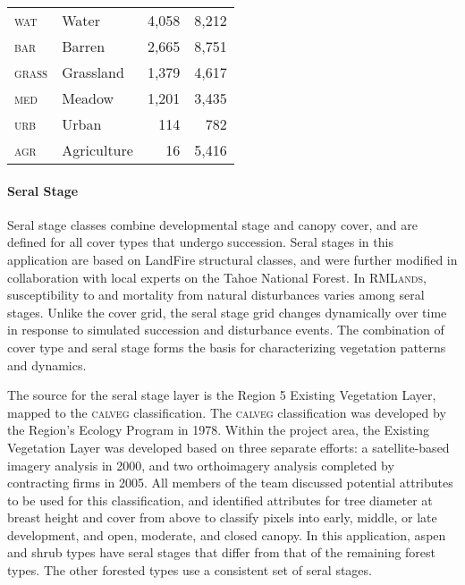 \begin{table}[!htbp]
\begin{tabular}{@{}llrr@{}}
                        \textsc{wat     }     & Water                                        & 4,058          & 8,212          \\
\rowcolor[HTML]{CAD6BA} \textsc{bar     }     & Barren                                       & 2,665        & 8,751     \\
                        \textsc{grass   }     & Grassland                                    & 1,379        & 4,617     \\
\rowcolor[HTML]{CAD6BA} \textsc{med     }     & Meadow                                       & 1,201        & 3,435     \\
                        \textsc{urb     }     & Urban                                        & 114                  & 782            \\
\rowcolor[HTML]{CAD6BA} \textsc{agr     }     & Agriculture                                  & 16          & 5,416     \\ \bottomrule

\end{tabular}
\end{table}
\normalsize

\paragraph{Seral Stage}
Seral stage classes combine developmental stage and canopy cover, and are defined for all cover types that undergo succession. Seral stages in this application are based on LandFire structural classes, and were further modified in collaboration with local experts on the Tahoe National Forest. In \textsc{RMLands}, susceptibility to and mortality from natural disturbances varies among seral stages. Unlike the cover grid, the seral stage grid changes dynamically over time in response to simulated succession and disturbance events. The combination of cover type and seral stage forms the basis for characterizing vegetation patterns and dynamics.

The source for the seral stage layer is the Region 5 Existing Vegetation Layer, mapped to the \textsc{calveg} classification. The \textsc{calveg} classification was developed by the Region's Ecology Program in 1978. Within the project area, the Existing Vegetation Layer was developed based on three separate efforts: a satellite-based imagery analysis in 2000, and two orthoimagery analysis completed by contracting firms in 2005. All members of the team discussed potential attributes to be used for this classification, and identified attributes for tree diameter at breast height and cover from above to classify pixels into early, middle, or late development, and open, moderate, and closed canopy. In this application, aspen and shrub types have seral stages that differ from that of the remaining forest types. The other forested types use a consistent set of seral stages.

